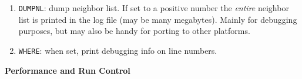 \begin{enumerate}

\item   {\tt DUMPNL}: dump neighbor list. 
        If set to a positive number the {\em entire}
        neighbor list is printed in the log file (may be many megabytes).
        Mainly for debugging purposes, but may also be handy for
        porting to other platforms.
\item   {\tt WHERE}: when set, print debugging info on line numbers.


\end{enumerate}

{\bf Performance and Run Control}

